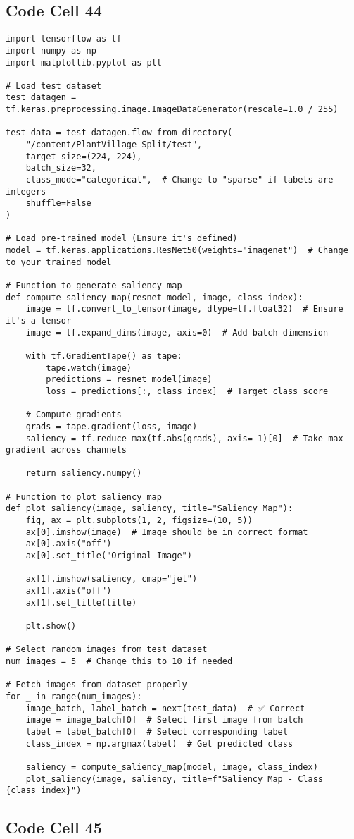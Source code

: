 \documentclass{article}
\begin{document}
\subsection*{Code Cell 44}
\begin{lstlisting}
import tensorflow as tf
import numpy as np
import matplotlib.pyplot as plt

# Load test dataset
test_datagen = tf.keras.preprocessing.image.ImageDataGenerator(rescale=1.0 / 255)

test_data = test_datagen.flow_from_directory(
    "/content/PlantVillage_Split/test",
    target_size=(224, 224),
    batch_size=32,
    class_mode="categorical",  # Change to "sparse" if labels are integers
    shuffle=False
)

# Load pre-trained model (Ensure it's defined)
model = tf.keras.applications.ResNet50(weights="imagenet")  # Change to your trained model

# Function to generate saliency map
def compute_saliency_map(resnet_model, image, class_index):
    image = tf.convert_to_tensor(image, dtype=tf.float32)  # Ensure it's a tensor
    image = tf.expand_dims(image, axis=0)  # Add batch dimension

    with tf.GradientTape() as tape:
        tape.watch(image)
        predictions = resnet_model(image)
        loss = predictions[:, class_index]  # Target class score

    # Compute gradients
    grads = tape.gradient(loss, image)
    saliency = tf.reduce_max(tf.abs(grads), axis=-1)[0]  # Take max gradient across channels

    return saliency.numpy()

# Function to plot saliency map
def plot_saliency(image, saliency, title="Saliency Map"):
    fig, ax = plt.subplots(1, 2, figsize=(10, 5))
    ax[0].imshow(image)  # Image should be in correct format
    ax[0].axis("off")
    ax[0].set_title("Original Image")

    ax[1].imshow(saliency, cmap="jet")
    ax[1].axis("off")
    ax[1].set_title(title)

    plt.show()

# Select random images from test dataset
num_images = 5  # Change this to 10 if needed

# Fetch images from dataset properly
for _ in range(num_images):
    image_batch, label_batch = next(test_data)  # ✅ Correct
    image = image_batch[0]  # Select first image from batch
    label = label_batch[0]  # Select corresponding label
    class_index = np.argmax(label)  # Get predicted class

    saliency = compute_saliency_map(model, image, class_index)
    plot_saliency(image, saliency, title=f"Saliency Map - Class {class_index}")
\end{lstlisting}

\subsection*{Code Cell 45}
\begin{lstlisting}

\end{lstlisting}
\end{document}
